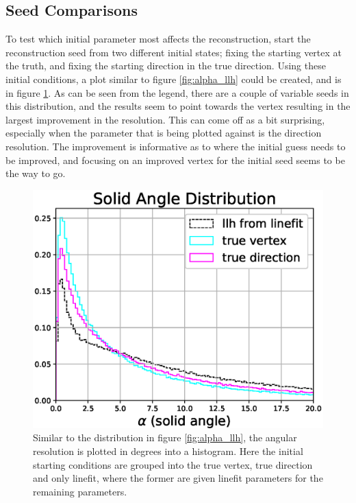 \subsection{Seed Comparisons}

To test which initial parameter most affects the reconstruction, start the reconstruction seed from two different initial states; fixing the starting vertex at the truth, and fixing the starting direction in the true direction. Using these initial conditions, a plot similar to figure \ref{fig:alpha_llh} could be created, and is in figure \ref{fig:alpha_llh_test}. As can be seen from the legend, there are a couple of variable seeds in this distribution, and the results seem to point towards the vertex resulting in the largest improvement in the resolution. This can come off as a bit surprising, especially when the parameter that is being plotted against is the direction resolution. The improvement is informative as to where the initial guess needs to be improved, and focusing on an improved vertex for the initial seed seems to be the way to go.

\begin{figure}[H]
  \centering
  \includegraphics[width=12cm]{./Figures/reco_plots/alpha_dist_llh_seedcomparison.eps}
  \caption{Similar to the distribution in figure \ref{fig:alpha_llh}, the angular resolution is plotted in degrees into a histogram. Here the initial starting conditions are grouped into the true vertex, true direction and only linefit, where the former are given linefit parameters for the remaining parameters.}
  \label{fig:alpha_llh_test}
\end{figure}

